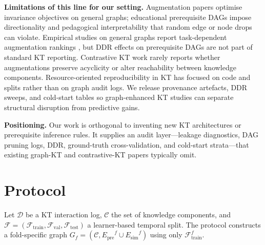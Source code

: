 \documentclass[runningheads]{llncs}
\newcommand{\Epre}{\ensuremath{E_{\text{pre}}}}
\newcommand{\Esim}{\ensuremath{E_{\text{sim}}}}
\newcommand{\KCs}{knowledge components}
\newcommand{\DDR}{\textsc{DDR}}
\begin{document}
\textbf{Limitations of this line for our setting.}
Augmentation papers optimise invariance objectives on general graphs;
educational prerequisite DAGs impose directionality and pedagogical
interpretability that random edge or node drops can violate. Empirical
studies on general graphs report task-dependent augmentation rankings
\cite{zhu2020graphtsa}, but \DDR{} effects on prerequisite DAGs are not
part of standard KT reporting. Contrastive KT work rarely reports whether
augmentations preserve acyclicity or alter reachability between \KCs{}.
Resource-oriented reproducibility in KT has focused on code and splits
\cite{liu2022pykt} rather than on graph audit logs. We release provenance
artefacts, \DDR{} sweeps, and cold-start tables so graph-enhanced KT
studies can separate structural disruption from predictive gains.

\textbf{Positioning.}
Our work is orthogonal to inventing new KT architectures or prerequisite
inference rules. It supplies an audit layer---leakage diagnostics, DAG
pruning logs, \DDR{}, ground-truth cross-validation, and cold-start
strata---that existing graph-KT and contrastive-KT papers typically omit.
\section{Protocol}
\label{sec:protocol}
Let $\mathcal{D}$ be a KT interaction log, $\mathcal{C}$ the set of
\KCs{}, and $\mathcal{F}=(\mathcal{F}_{\text{train}},
\mathcal{F}_{\text{val}},\mathcal{F}_{\text{test}})$ a learner-based
temporal split. The protocol constructs a fold-specific graph
$G_f=(\mathcal{C},\Epre^f\cup\Esim^f)$ using only
$\mathcal{F}_{\text{train}}^f$.
\end{document}
